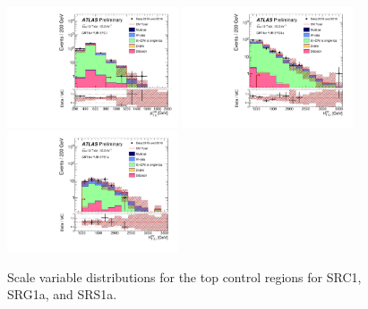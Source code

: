 \begin{figure}[tbp]
\begin{center}
\includegraphics[width=0.45\textwidth]{figures/ATLAS-CONF-2016-078_INT/N-1Plots/AtlasStyle/Preliminary/CRT_SRJigsawSRC1_LastCut_CRT_minusone}
\includegraphics[width=0.45\textwidth]{figures/ATLAS-CONF-2016-078_INT/N-1Plots/AtlasStyle/Preliminary/CRT_SRJigsawSRG1a_LastCut_CRT_minusone}
\includegraphics[width=0.45\textwidth]{figures/ATLAS-CONF-2016-078_INT/N-1Plots/AtlasStyle/Preliminary/CRT_SRJigsawSRS1a_LastCut_CRT_minusone}
\end{center}
\caption{Scale variable distributions for the top control regions for SRC1, SRG1a, and SRS1a.}
\label{fig:CRT}
\end{figure}

